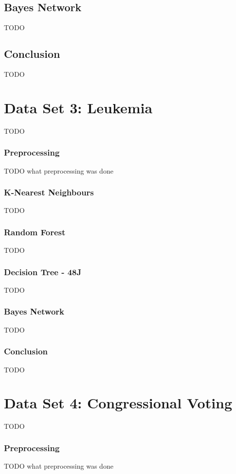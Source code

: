 \documentclass{sig-alternate-05-2015}
\begin{document}
\subsection{Bayes Network}
TODO\\
\subsection{Conclusion}
TODO\\


\section{Data Set 3: Leukemia}
TODO\\
\subsubsection{Preprocessing}
TODO what preprocessing was done\\
\subsubsection{K-Nearest Neighbours}
TODO\\
\subsubsection{Random Forest}
TODO\\
\subsubsection{Decision Tree - 48J}
TODO\\
\subsubsection{Bayes Network}
TODO\\
\subsubsection{Conclusion}
TODO\\


\section{Data Set 4: Congressional Voting}
TODO\\
\subsubsection{Preprocessing}
TODO what preprocessing was done\\
\end{document}
